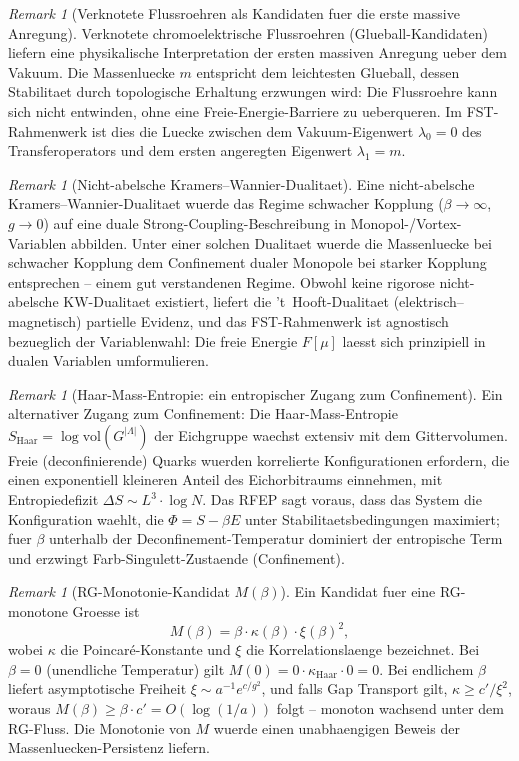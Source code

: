 \documentclass[12pt,a4paper]{article}
\theoremstyle{definition}
\theoremstyle{plain}
\theoremstyle{remark}
\newtheorem{remark}[definition]{Remark}
\begin{document}
\begin{remark}[Verknotete Flussroehren als Kandidaten fuer die erste massive Anregung]
\label{rem:knotted-flux}
Verknotete chromoelektrische Flussroehren (Glueball-Kandidaten) liefern eine physikalische Interpretation der ersten massiven Anregung ueber dem Vakuum. Die Massenluecke $m$ entspricht dem leichtesten Glueball, dessen Stabilitaet durch topologische Erhaltung erzwungen wird: Die Flussroehre kann sich nicht entwinden, ohne eine Freie-Energie-Barriere zu ueberqueren. Im FST-Rahmenwerk ist dies die Luecke zwischen dem Vakuum-Eigenwert $\lambda_0 = 0$ des Transferoperators und dem ersten angeregten Eigenwert $\lambda_1 = m$.
\end{remark}

\begin{remark}[Nicht-abelsche Kramers--Wannier-Dualitaet]
\label{rem:non-abelian-kw}
Eine nicht-abelsche Kramers--Wannier-Dualitaet wuerde das Regime schwacher Kopplung ($\beta \to \infty$, $g \to 0$) auf eine duale Strong-Coupling-Beschreibung in Monopol-/Vortex-Variablen abbilden. Unter einer solchen Dualitaet wuerde die Massenluecke bei schwacher Kopplung dem Confinement dualer Monopole bei starker Kopplung entsprechen -- einem gut verstandenen Regime. Obwohl keine rigorose nicht-abelsche KW-Dualitaet existiert, liefert die 't~Hooft-Dualitaet (elektrisch--magnetisch) partielle Evidenz, und das FST-Rahmenwerk ist agnostisch bezueglich der Variablenwahl: Die freie Energie $F[\mu]$ laesst sich prinzipiell in dualen Variablen umformulieren.
\end{remark}

\begin{remark}[Haar-Mass-Entropie: ein entropischer Zugang zum Confinement]
\label{rem:haar-entropy}
Ein alternativer Zugang zum Confinement: Die Haar-Mass-Entropie $S_{\mathrm{Haar}} = \log \mathrm{vol}(G^{|\Lambda|})$ der Eichgruppe waechst extensiv mit dem Gittervolumen. Freie (deconfinierende) Quarks wuerden korrelierte Konfigurationen erfordern, die einen exponentiell kleineren Anteil des Eichorbitraums einnehmen, mit Entropiedefizit $\Delta S \sim L^3 \cdot \log N$. Das RFEP sagt voraus, dass das System die Konfiguration waehlt, die $\Phi = S - \beta E$ unter Stabilitaetsbedingungen maximiert; fuer $\beta$ unterhalb der Deconfinement-Temperatur dominiert der entropische Term und erzwingt Farb-Singulett-Zustaende (Confinement).
\end{remark}

\begin{remark}[RG-Monotonie-Kandidat $M(\beta)$]
\label{rem:rg-monotone}
Ein Kandidat fuer eine RG-monotone Groesse ist
\[
M(\beta) = \beta \cdot \kappa(\beta) \cdot \xi(\beta)^2,
\]
wobei $\kappa$ die Poincar\'e-Konstante und $\xi$ die Korrelationslaenge bezeichnet. Bei $\beta = 0$ (unendliche Temperatur) gilt $M(0) = 0 \cdot \kappa_{\mathrm{Haar}} \cdot 0 = 0$. Bei endlichem $\beta$ liefert asymptotische Freiheit $\xi \sim a^{-1} e^{c/g^2}$, und falls Gap Transport gilt, $\kappa \geq c'/\xi^2$, woraus $M(\beta) \geq \beta \cdot c' = O(\log(1/a))$ folgt -- monoton wachsend unter dem RG-Fluss. Die Monotonie von $M$ wuerde einen unabhaengigen Beweis der Massenluecken-Persistenz liefern.
\end{remark}
\end{document}
